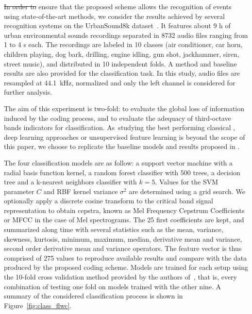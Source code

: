 \documentclass[sensors,article,accept,moreauthors,pdftex,10pt,a4paper]{mdpi}
\providecommand{\DIFaddtex}[1]{{\protect\color{blue}\uwave{#1}}} %
\providecommand{\DIFdeltex}[1]{{\protect\color{red}\sout{#1}}}                      %
\providecommand{\DIFaddbegin}{} %
\providecommand{\DIFaddend}{} %
\providecommand{\DIFdelbegin}{} %
\providecommand{\DIFdelend}{} %
\providecommand{\DIFadd}[1]{\texorpdfstring{\DIFaddtex{#1}}{#1}} %
\providecommand{\DIFdel}[1]{\texorpdfstring{\DIFdeltex{#1}}{}} %
\begin{document}
\DIFdelbegin \DIFdel{In order to }\DIFdelend \DIFaddbegin {\DIFadd{To}} \DIFaddend ensure that the proposed scheme allows the recognition of events using state-of-the-art methods, we consider the results achieved by several recognition systems on the UrbanSound8k dataset~\cite{salamon2014}. It features about 9 h of urban environmental sounds recordings separated in 8732 audio files ranging from 1 to 4 s each. The recordings are labeled in 10 classes (air conditioner, car horn, children playing, dog bark, drilling, engine idling, gun shot, jackhammer, siren,\DIFaddbegin { \DIFadd{and}} \DIFaddend street music), and distributed in 10 independent folds. A method and baseline results are also provided for the classification task. In this study, audio files are resampled at 44.1~kHz, normalized and only the left channel is considered for further analysis.

The aim of this experiment is two-fold: to evaluate the global loss of information induced by the coding process, and to evaluate the adequacy of third-octave bands indicators for classification. As~studying the best performing classical \DIFdelbegin %
\DIFdelend \DIFaddbegin {\DIFadd{models}} \DIFaddend \citep{ntalampiras2013}, %
deep learning approaches \citep{salamon2017} or unsupervised feature learning is beyond the scope of this paper, we choose to replicate the baseline models and results proposed in \cite{salamon2014}.

The four classification models are as follow: a support vector machine with a radial basis function kernel, a random forest classifier with 500 trees, a decision tree and a k-nearest neighbors classifier with $k = 5$. Values for the SVM parameter $C$ and RBF kernel variance $\sigma^2$ are determined using a grid search. We optionally apply a discrete cosine transform to the critical band signal representation to obtain cepstra, known as Mel Frequency Cepstrum Coefficients or MFCC in the case of Mel spectrograms. The 25 first coefficients are kept, and summarized along time with several statistics such as the mean, variance, skewness, kurtosis, minimum, maximum, median, derivative mean and variance, second order derivative mean and variance operators. The feature vector is thus comprised of 275 values to reproduce available results and compare with the data produced by the proposed coding scheme. Models are trained for each setup using the 10-fold cross validation method provided by the authors \mbox{of \cite{salamon2014},} that is, every combination of testing one fold on models trained with the other nine. A summary of the considered classification process is shown in Figure~\ref{fig:class_flwc}.
\end{document}
